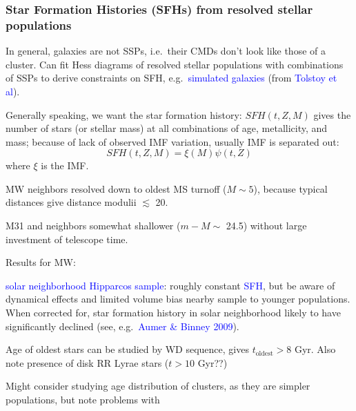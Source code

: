\documentclass[12pt]{article}
\begin{document}
\subsubsection*{Star Formation Histories (SFHs) from resolved stellar populations}
      \begin{itemize*}
          \item In general, galaxies are not SSPs, i.e.\ their CMDs don't look
              like those of a cluster. Can fit Hess diagrams of resolved stellar
              populations with combinations of SSPs to derive constraints on SFH,
              e.g.\ \textcolor{blue}{simulated galaxies} (from \textcolor{blue}
              {Tolstoy et al}).
          \item Generally speaking, we want the star formation history:
              $SFH(t,Z,M)$ gives the number of stars (or stellar mass) at all
              combinations of age, metallicity, and mass; because of lack of
              observed IMF variation, usually IMF is separated out:
              $$ SFH(t,Z,M) = \xi(M)\psi(t,Z) $$
              where $\xi$ is the IMF.
          \item MW neighbors resolved down to oldest MS turnoff ($M \sim 5$),
              because typical distances give distance modulii $\lesssim$ 20.
          \item M31 and neighbors somewhat shallower ($m-M\sim$ 24.5)
              without large investment of telescope time.
          \item Results for MW:
              \begin{itemize*}
                  \item \textcolor{blue}{solar neighborhood Hipparcos sample}:
                      roughly constant \textcolor{blue}{SFH}, but be aware
                      of dynamical effects and limited volume bias nearby
                      sample to younger populations. When corrected for, star
                      formation history in solar neighborhood likely to have
                      significantly declined (see, e.g.\ \textcolor{blue}
                      {Aumer \& Binney 2009}).
                  \item Age of oldest stars can be studied by WD sequence,
                      gives $t_{\textrm{oldest}} > 8$ Gyr. Also note presence
                      of disk RR Lyrae stars ($t > 10$ Gyr??)
                  \item Might consider studying age distribution of clusters,
                      as they are simpler populations, but note problems with

\end{itemize*}
\end{itemize*}
\end{document}
